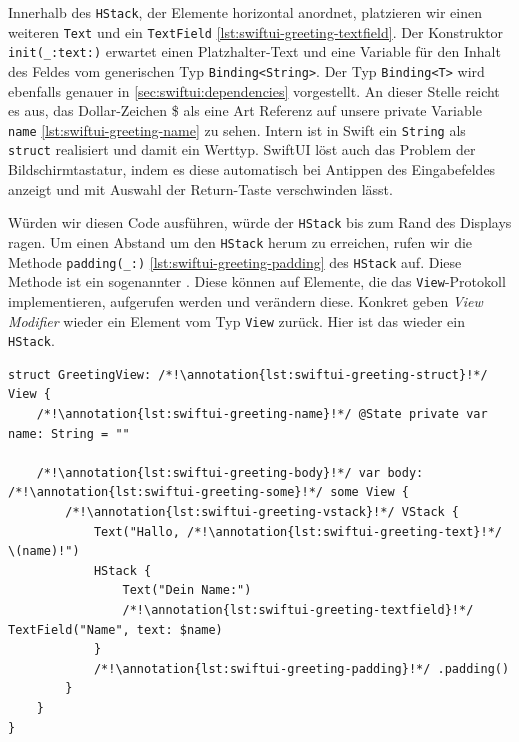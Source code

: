\begin{bsp}
Innerhalb des \texttt{HStack}, der Elemente horizontal anordnet, platzieren wir einen weiteren \texttt{Text} und ein \texttt{TextField} \ref*{lst:swiftui-greeting-textfield}. Der Konstruktor \texttt{init(\_:text:)} erwartet einen Platzhalter-Text und eine Variable für den Inhalt des Feldes vom generischen Typ \texttt{Binding<String>}. Der Typ \texttt{Binding<T>} wird ebenfalls genauer in \autoref{sec:swiftui:dependencies} vorgestellt. An dieser Stelle reicht es aus, das Dollar-Zeichen \$ als eine Art Referenz auf unsere private Variable \texttt{name} \ref*{lst:swiftui-greeting-name} zu sehen. Intern ist in Swift ein \texttt{String} als \texttt{struct} realisiert und damit ein Werttyp. SwiftUI löst auch das Problem der Bildschirmtastatur, indem es diese automatisch bei Antippen des Eingabefeldes anzeigt und mit Auswahl der Return-Taste verschwinden lässt.

Würden wir diesen Code ausführen, würde der \texttt{HStack} bis zum Rand des Displays ragen. Um einen Abstand um den \texttt{HStack} herum zu erreichen, rufen wir die Methode \texttt{padding(\_:)} \ref*{lst:swiftui-greeting-padding} des \texttt{HStack} auf. Diese Methode ist ein sogenannter . Diese können auf Elemente, die das \texttt{View}-Protokoll implementieren, aufgerufen werden und verändern diese. Konkret geben \emph{View Modifier} wieder ein Element vom Typ \texttt{View} zurück. Hier ist das wieder ein \texttt{HStack}.

\begin{lstlisting}[caption={\texttt{GreetingView.swift}},label={lst:swiftui-greeting}]
struct GreetingView: /*!\annotation{lst:swiftui-greeting-struct}!*/ View {
    /*!\annotation{lst:swiftui-greeting-name}!*/ @State private var name: String = ""
    
    /*!\annotation{lst:swiftui-greeting-body}!*/ var body: /*!\annotation{lst:swiftui-greeting-some}!*/ some View {
        /*!\annotation{lst:swiftui-greeting-vstack}!*/ VStack {
            Text("Hallo, /*!\annotation{lst:swiftui-greeting-text}!*/ \(name)!")
            HStack {
                Text("Dein Name:")
                /*!\annotation{lst:swiftui-greeting-textfield}!*/ TextField("Name", text: $name)
            }
            /*!\annotation{lst:swiftui-greeting-padding}!*/ .padding()
        }
    }
}

\end{lstlisting}
\setcounter{lstannotation}{0}
	
\end{bsp}

